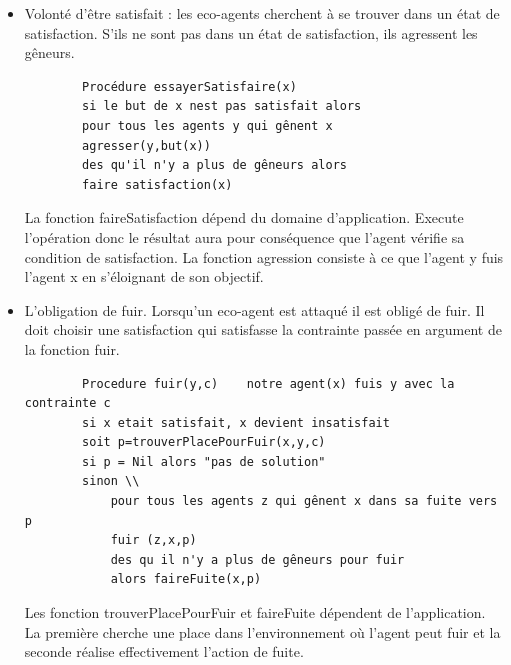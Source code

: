         \begin{itemize}
        \item  Volonté d'être satisfait : les eco-agents cherchent à se trouver dans un état de satisfaction. S'ils ne sont pas dans un état de satisfaction, ils agressent les gêneurs. \\
        \begin{verbatim}
        Procédure essayerSatisfaire(x) 
        si le but de x nest pas satisfait alors 
        pour tous les agents y qui gênent x 
        agresser(y,but(x))
        des qu'il n'y a plus de gêneurs alors 
        faire satisfaction(x)
        \end{verbatim}
        La fonction faireSatisfaction dépend du domaine d'application. Execute l'opération donc le résultat aura pour conséquence que l'agent vérifie sa condition de satisfaction. La fonction agression consiste à ce que l'agent y fuis l'agent x en s'éloignant de son objectif.  
        \item L'obligation de fuir. Lorsqu'un eco-agent est attaqué il est obligé de fuir. Il doit choisir une satisfaction qui satisfasse la contrainte passée en argument de la fonction fuir. \\
       \begin{verbatim}
        Procedure fuir(y,c)    notre agent(x) fuis y avec la contrainte c
        si x etait satisfait, x devient insatisfait 
        soit p=trouverPlacePourFuir(x,y,c) 
        si p = Nil alors "pas de solution"
        sinon \\
            pour tous les agents z qui gênent x dans sa fuite vers p 
            fuir (z,x,p) 
            des qu il n'y a plus de gêneurs pour fuir
            alors faireFuite(x,p) 
        \end{verbatim}    
        Les fonction trouverPlacePourFuir et faireFuite dépendent de l'application. La première cherche une place dans l'environnement où l'agent peut fuir et la seconde réalise effectivement l'action de fuite.     
        \end{itemize}
    
    
    
